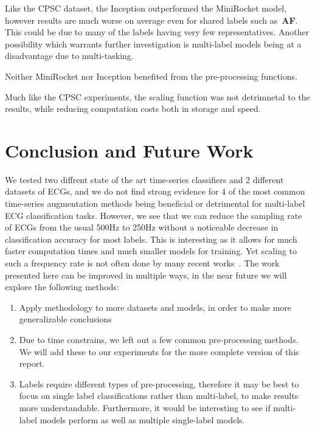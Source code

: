 \documentclass{article}
\begin{document}
\begin{enumerate*}
  \item  Like the CPSC dataset, the Inception outperformed the MiniRocket model, however results are much worse on average even for shared labels such as~\textbf{AF}. This could be due to many of the labels having very few representatives. Another possibility which warrants further investigation is  multi-label models being at a disadvantage due to multi-tasking. 
  \item Neither MiniRocket nor Inception benefited from the pre-processing functions. 
  \item Much like the CPSC experiments, the scaling function was not detrimnetal to the results, while reducing computation costs both in storage and speed. 
\end{enumerate*}


\section{Conclusion and Future Work}
We tested two diffrent state of the art time-series classifiers and 2 different datasets of ECGs, and we do not find strong evidence for 4 of the most common time-series augmentation methods being beneficial or detrimental for multi-label ECG classification tasks.  However, we see that we can reduce the sampling rate of ECGs from the usual 500Hz to 250Hz without a noticeable decrease in classification accuracy for most labels. This is interesting as it allows for much faster computation times and much smaller models for training. Yet scaling to such a frequency rate is not often done by many recent works~\cite{hong2022practical}.
The work presented here can be improved in multiple ways, in the near future we will explore the following methods: 
\begin{enumerate}
\item Apply methodology to more datasets and models, in order to make more generalizable conclusions
\item Due to time constrains, we left out a few common pre-processing methods. We will add these to our experiments for the more complete version of this report. 
\item Labels require different types of pre-processing, therefore it may be best to focus on single label classifications rather than multi-label, to make results more understandable. Furthermore, it would be interesting to see if multi-label models perform as well as multiple single-label models. 
\end{enumerate}
\printbibliography
\end{document}
